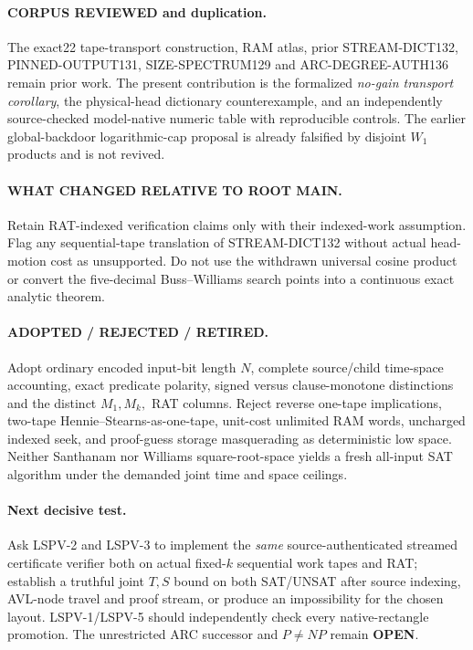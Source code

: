 \documentclass[11pt]{article}
\newcommand{\OPEN}{\textbf{OPEN}}
\begin{document}
\paragraph{CORPUS REVIEWED and duplication.} The exact22 tape-transport construction, RAM atlas, prior STREAM-DICT132, PINNED-OUTPUT131, SIZE-SPECTRUM129 and ARC-DEGREE-AUTH136 remain prior work. The present contribution is the formalized \emph{no-gain transport corollary}, the physical-head dictionary counterexample, and an independently source-checked model-native numeric table with reproducible controls. The earlier global-backdoor logarithmic-cap proposal is already falsified by disjoint $W_1$ products and is not revived.

\paragraph{WHAT CHANGED RELATIVE TO ROOT MAIN.} Retain RAT-indexed verification claims only with their indexed-work assumption. Flag any sequential-tape translation of STREAM-DICT132 without actual head-motion cost as unsupported. Do not use the withdrawn universal cosine product or convert the five-decimal Buss--Williams search points into a continuous exact analytic theorem.

\paragraph{ADOPTED / REJECTED / RETIRED.} Adopt ordinary encoded input-bit length $N$, complete source/child time-space accounting, exact predicate polarity, signed versus clause-monotone distinctions and the distinct $M_1,M_k,$ RAT columns. Reject reverse one-tape implications, two-tape Hennie--Stearns-as-one-tape, unit-cost unlimited RAM words, uncharged indexed seek, and proof-guess storage masquerading as deterministic low space. Neither Santhanam nor Williams square-root-space yields a fresh all-input SAT algorithm under the demanded joint time and space ceilings.

\paragraph{Next decisive test.} Ask LSPV-2 and LSPV-3 to implement the \emph{same} source-authenticated streamed certificate verifier both on actual fixed-$k$ sequential work tapes and RAT; establish a truthful joint $T,S$ bound on both SAT/UNSAT after source indexing, AVL-node travel and proof stream, or produce an impossibility for the chosen layout. LSPV-1/LSPV-5 should independently check every native-rectangle promotion. The unrestricted ARC successor and $P\ne NP$ remain \OPEN.
\end{document}
